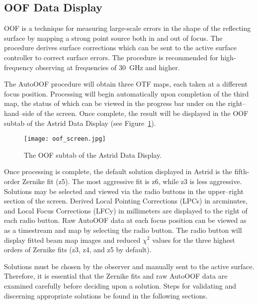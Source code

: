 \newpage

\subsection{OOF Data Display}\label{sec:oofdatadisplay}

\gls{OOF} is a technique for measuring large-scale errors in the shape of the reflecting
surface by mapping a strong point source both in and out of focus.  The procedure
derives surface corrections which can be sent to the active surface controller to
correct surface errors. The procedure is recommended for high-frequency observing at
frequencies of 30~GHz and higher.

The AutoOOF procedure will obtain three \gls{OTF} maps, each taken at a different focus
position.  Processing will begin automatically upon completion of the third map, the
status of which can be viewed in the progress bar under 
on the right--hand--side of the screen.  Once complete, the result will be displayed
in the \gls{OOF} subtab of the \gls{Astrid} Data Display (see
Figure~\ref{fig:AstridAutoOOF}).

\begin{figure}[!h]
\begin{center}
\texttt{[image: oof\_screen.jpg]}
\caption[The OOF subtab of the Astrid Data Display]
{The OOF subtab of the \gls{Astrid} Data Display.\label{fig:AstridAutoOOF} }
\end{center}
\end{figure}

Once processing is complete, the default solution displayed in \gls{Astrid} is the
fifth-order Zernike fit (z5).  The most aggressive fit is z6, while z3 is less
aggressive.  Solutions may be selected and viewed via the radio buttons in the
upper--right section of the screen.  Derived Local Pointing Corrections (LPCs) in
arcminutes, and Local Focus Corrections (LFCy) in millimeters are displayed to the right
of each radio button.  Raw AutoOOF data at each focus position can be viewed as
as a timestream and map by selecting the  radio button.  The
 radio button will display fitted beam map images and
reduced $\chi^{2}$ values for the three highest orders of Zernike fits
(z3, z4, and z5 by default).

Solutions must be chosen by the observer and manually sent to the active surface.
Therefore, it is essential that the Zernike fits and raw AutoOOF data are examined
carefully before deciding upon a solution.  Steps for validating and discerning
appropriate solutions be found in the following sections.

